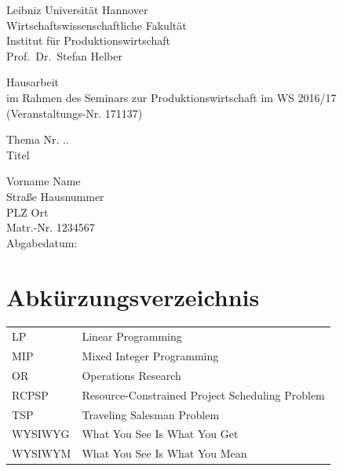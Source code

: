 \documentclass[a4paper,12pt,parskip,bibtotoc,liststotoc]{article}
\begin{document}
%
%
\thispagestyle{empty}  %
Leibniz Universität Hannover\\
Wirtschaftswissenschaftliche Fakultät\\
Institut für Produktionswirtschaft\\
Prof.\ Dr.\ Stefan Helber

\vspace{5cm}

\begin{center}
Hausarbeit \\
im Rahmen des Seminars zur Produktionswirtschaft im WS 2016/17 \\
(Veranstaltungs-Nr. 171137)

\vspace{2.5cm}

Thema Nr. ..\\[1mm]    %
{\Large Titel }
\end{center}

\vspace{7.5cm}

Vorname Name \\
Straße Hausnummer \\
PLZ Ort \\
Matr.-Nr. 1234567 \\[3mm]
Abgabedatum:


\newpage

\tableofcontents

\newpage  %

\listoffigures

\listoftables

\section*{Abkürzungsverzeichnis}
\begin{table}[h!]
    \vspace*{-3mm}
    \hspace*{2mm}
  \renewcommand{\arraystretch}{1,5}
    \begin{tabular}{ll}  %
     LP	        & Linear Programming\\
     MIP		& Mixed Integer Programming\\
     OR		    & Operations Research\\
     RCPSP      & Resource-Constrained Project Scheduling Problem\\
     TSP        & Traveling Salesman Problem\\
     WYSIWYG    & What You See Is What You Get\\
     WYSIWYM    & What You See Is What You Mean\\
	\end{tabular}
\end{table}
\end{document}
